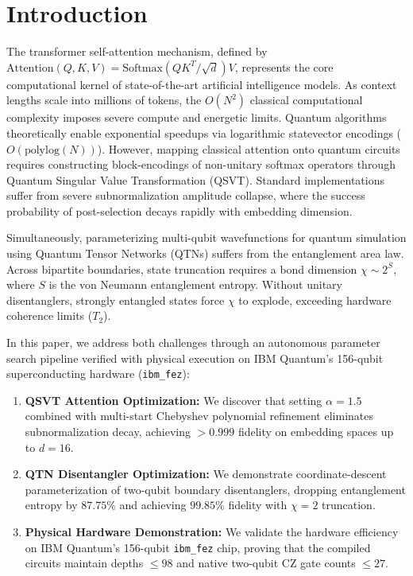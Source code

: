 \documentclass[conference]{IEEEtran}
\begin{document}
\section{Introduction}
The transformer self-attention mechanism, defined by $\text{Attention}(Q, K, V) = \text{Softmax}(QK^T / \sqrt{d})V$, represents the core computational kernel of state-of-the-art artificial intelligence models. As context lengths scale into millions of tokens, the $O(N^2)$ classical computational complexity imposes severe compute and energetic limits. Quantum algorithms theoretically enable exponential speedups via logarithmic statevector encodings ($O(\text{polylog}(N))$). However, mapping classical attention onto quantum circuits requires constructing block-encodings of non-unitary softmax operators through Quantum Singular Value Transformation (QSVT). Standard implementations suffer from severe subnormalization amplitude collapse, where the success probability of post-selection decays rapidly with embedding dimension.

Simultaneously, parameterizing multi-qubit wavefunctions for quantum simulation using Quantum Tensor Networks (QTNs) suffers from the entanglement area law. Across bipartite boundaries, state truncation requires a bond dimension $\chi \sim 2^{S}$, where $S$ is the von Neumann entanglement entropy. Without unitary disentanglers, strongly entangled states force $\chi$ to explode, exceeding hardware coherence limits ($T_2$).

In this paper, we address both challenges through an autonomous parameter search pipeline verified with physical execution on IBM Quantum's 156-qubit superconducting hardware (\texttt{ibm\_fez}):
\begin{enumerate}
    \item \textbf{QSVT Attention Optimization:} We discover that setting $\alpha = 1.5$ combined with multi-start Chebyshev polynomial refinement eliminates subnormalization decay, achieving $>0.999$ fidelity on embedding spaces up to $d=16$.
    \item \textbf{QTN Disentangler Optimization:} We demonstrate coordinate-descent parameterization of two-qubit boundary disentanglers, dropping entanglement entropy by $87.75\%$ and achieving $99.85\%$ fidelity with $\chi=2$ truncation.
    \item \textbf{Physical Hardware Demonstration:} We validate the hardware efficiency on IBM Quantum's 156-qubit \texttt{ibm\_fez} chip, proving that the compiled circuits maintain depths $\le 98$ and native two-qubit CZ gate counts $\le 27$.
\end{enumerate}
\end{document}
